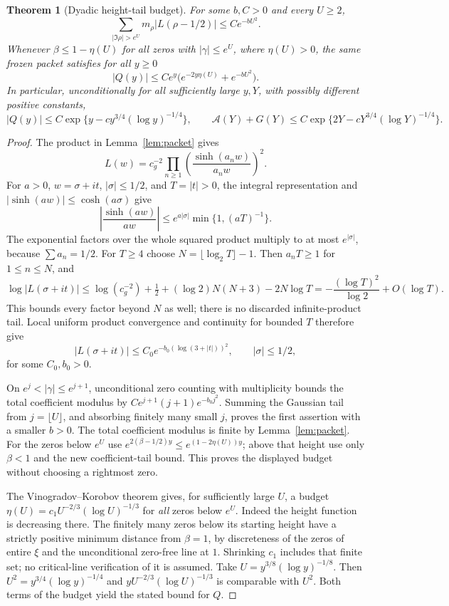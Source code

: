 \documentclass[11pt]{article}
\newtheorem{theorem}{Theorem}
\theoremstyle{remark}\newtheorem{remark}[theorem]{Remark}
\begin{document}
\begin{theorem}[Dyadic height-tail budget]\label{thm:height-tail}
For some $b,C>0$ and every $U\ge2$,
\[
 \sum_{|\Im\rho|>e^U}m_\rho|L(\rho-1/2)|\le Ce^{-bU^2}.
\]
Whenever $\beta\le1-\eta(U)$ for all zeros with
$|\gamma|\le e^U$, where $\eta(U)>0$, the same frozen packet satisfies
for all $y\ge0$
\[
 |Q(y)|\le Ce^y
       \bigl(e^{-2y\eta(U)}+e^{-bU^2}\bigr).
\]
In particular, unconditionally for all sufficiently large $y,Y$,
with possibly different positive constants,
\[
 |Q(y)|\le C\exp\{y-cy^{3/4}(\log y)^{-1/4}\},
 \qquad
 \mathcal A(Y)+G(Y)\le
 C\exp\{2Y-cY^{3/4}(\log Y)^{-1/4}\}.
\]
\end{theorem}
\begin{proof}
The product in Lemma~\ref{lem:packet} gives
\[
 L(w)=c_g^{-2}\prod_{n\ge1}
                 \left(\frac{\sinh(a_nw)}{a_nw}\right)^2.
\]
For $a>0$, $w=\sigma+it$, $|\sigma|\le1/2$, and $T=|t|>0$,
the integral representation and $|\sinh(aw)|\le\cosh(a\sigma)$
give
\[
 \left|\frac{\sinh(aw)}{aw}\right|
 \le e^{a|\sigma|}\min\{1,(aT)^{-1}\}.
\]
The exponential factors over the whole squared product multiply
to at most $e^{|\sigma|}$, because $\sum a_n=1/2$.
For $T\ge4$ choose $N=\lfloor\log_2T\rfloor-1$. Then
$a_nT\ge1$ for $1\le n\le N$, and
\[
 \log|L(\sigma+it)|
 \le\log(c_g^{-2})+\tfrac12
       +(\log2)N(N+3)-2N\log T
 =-\frac{(\log T)^2}{\log2}+O(\log T).
\]
This bounds every factor beyond $N$ as well; there is no discarded
infinite-product tail. Local uniform product convergence and
continuity for bounded $T$ therefore give
\[
 |L(\sigma+it)|\le C_0
       e^{-b_0(\log(3+|t|))^2},\qquad |\sigma|\le1/2,
\]
for some $C_0,b_0>0$.

On $e^j<|\gamma|\le e^{j+1}$, unconditional zero counting with
multiplicity bounds the total coefficient modulus by
$C e^{j+1}(j+1)e^{-b_0j^2}$. Summing the Gaussian tail from
$j=\lfloor U\rfloor$, and absorbing finitely many small $j$,
proves the first assertion with a smaller $b>0$.
The total coefficient modulus is finite by Lemma~\ref{lem:packet}.
For the zeros below $e^U$ use
$e^{2(\beta-1/2)y}\le e^{(1-2\eta(U))y}$; above that height
use only $\beta<1$ and the new coefficient-tail bound.
This proves the displayed budget without choosing a rightmost zero.

The Vinogradov--Korobov theorem gives, for sufficiently large $U$,
a budget
$\eta(U)=c_1U^{-2/3}(\log U)^{-1/3}$ for \emph{all} zeros below
$e^U$. Indeed the height function is decreasing there.
The finitely many zeros below its starting height have a strictly
positive minimum distance from $\beta=1$, by discreteness of the
zeros of entire $\xi$ and the unconditional zero-free line at $1$.
Shrinking $c_1$ includes that finite set; no critical-line
verification of it is assumed.
Take $U=y^{3/8}(\log y)^{-1/8}$. Then
$U^2=y^{3/4}(\log y)^{-1/4}$ and
$yU^{-2/3}(\log U)^{-1/3}$ is comparable with $U^2$.
Both terms of the budget yield the stated bound for $Q$.


\end{proof}
\end{document}
